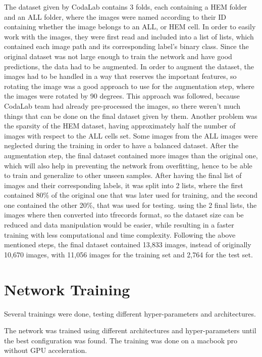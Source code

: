 \documentclass{article}
\begin{document}
\begin{adjustwidth}{-40pt}{-40pt}
The dataset given by CodaLab contains 3 folds, each containing a HEM folder and an ALL folder, where the images were named according to their ID containing whether the image belongs to an ALL, or HEM cell. In order to easily work with the images, they were first read and included into a list of lists, which contained each image path and its corresponding label's binary class. Since the original dataset was not large enough to train the network and have good predictions, the data had to be augmented. In order to augment the dataset, the images had to be handled in a way that reserves the important features, so rotating the image was a good approach to use for the augmentation step, where the images were rotated by 90 degrees. This approach was followed, because CodaLab team had already pre-processed the images, so there weren't much things that can be done on the final dataset given by them. Another problem was the sparsity of the HEM dataset, having approximately half the number of images with respect to the ALL cells set. Some images from the ALL images were neglected during the training in order to have a balanced dataset. After the augmentation step, the final dataset contained more images than the original one, which will also help in preventing the network from overfitting, hence to be able to train and generalize to other unseen samples. After having the final list of images and their corresponding labels, it was split into 2 lists, where the first contained 80\% of the original one that was later used for training, and the second one contained the other 20\%, that was used for testing. using the 2 final lists, the images where then converted into tfrecords format, so the dataset size can be reduced and data manipulation would be easier, while resulting in a faster training with less computational and time complexity.
Following the above mentioned steps, the final dataset contained 13,833 images, instead of originally 10,670 images, with 11,056 images for the training set and 2,764 for the test set.


\section{Network Training}

Several trainings were done, testing different hyper-parameters and architectures.

The network was trained using different architectures and hyper-parameters until the best configuration was found. The training was done on a macbook pro without GPU acceleration.


\end{adjustwidth}
\end{document}
